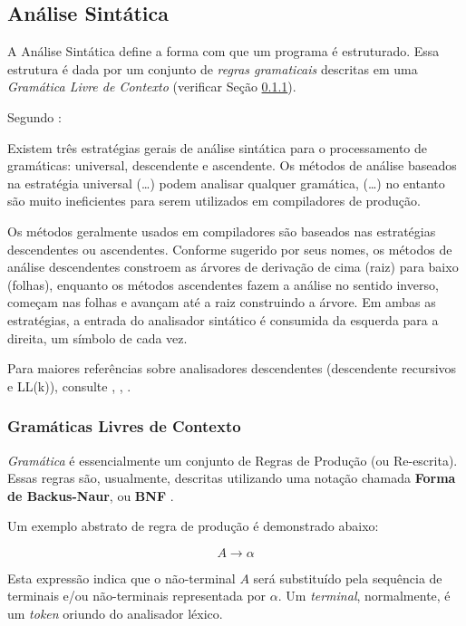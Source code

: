 \subsection{Análise Sintática}

A Análise Sintática define a forma com que um programa é estruturado. Essa
estrutura é dada por um conjunto de \emph{regras gramaticais} descritas em uma
\emph{Gramática Livre de Contexto} (verificar Seção \ref{sec:context_free_grammar}).

Segundo :
\begin{citacao}{4cm}{0cm}
	Existem três estratégias gerais de análise sintática para o processamento
	de gramáticas: universal, descendente e ascendente. Os métodos de análise
	baseados na estratégia universal (\dots) podem analisar qualquer
	gramática, (\dots) no entanto são muito ineficientes para serem utilizados
	em compiladores de produção.

	Os métodos geralmente usados em compiladores são baseados nas estratégias
	descendentes ou ascendentes. Conforme sugerido por seus nomes, os métodos
	de análise descendentes constroem as árvores de derivação de cima (raiz)
	para baixo (folhas), enquanto os métodos ascendentes fazem a análise no
	sentido inverso, começam nas folhas e avançam até a raiz construindo a
	árvore. Em ambas as estratégias, a entrada do analisador sintático é
	consumida da esquerda para a direita, um símbolo de cada vez.
\end{citacao}

Para maiores referências sobre analisadores descendentes (descendente
recursivos e LL(k)), consulte , ,
.

\subsubsection{Gramáticas Livres de Contexto}
\label{sec:context_free_grammar}

\emph{Gramática} é essencialmente um conjunto de Regras de Produção (ou
Re-escrita). Essas regras são, usualmente, descritas utilizando uma notação
chamada \textbf{Forma de Backus-Naur}, ou \textbf{BNF} \cite{louden97-pt}.

Um exemplo abstrato de regra de produção é demonstrado abaixo:

\[
A \rightarrow \alpha
\]

Esta expressão indica que o não-terminal \(A\) será substituído pela sequência
de terminais e/ou não-terminais representada por \(\alpha\). Um \emph{terminal},
normalmente, é um \emph{token} oriundo do analisador léxico.

